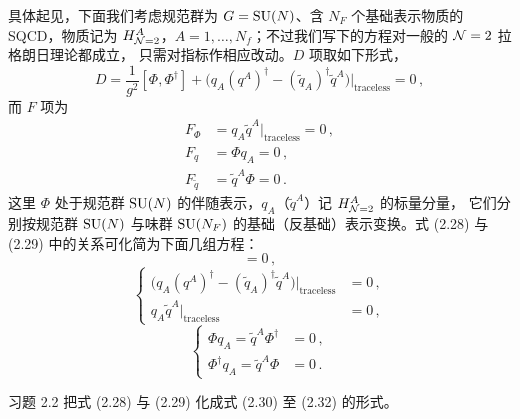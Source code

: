 
具体起见，下面我们考虑规范群为 $G=\mathrm{SU}(N)$、含 $N_F$ 个基础表示物质的 SQCD，物质记为
$H^A_{\mathcal{N}=2}$，$A=1,\dots,N_f$；不过我们写下的方程对一般的 $\mathcal{N}=2$ 拉格朗日理论都成立，
只需对指标作相应改动。$D$ 项取如下形式，
\begin{equation}
  D=\frac{1}{g^2}[\Phi,\Phi^\dagger]+\big(q_A(q^A)^\dagger-(\tilde q_A)^\dagger \tilde q^{A}\big)\big|_{\text{traceless}}=0\,,
  \tag{2.28}
\end{equation}
而 $F$ 项为
\begin{equation}
  \begin{aligned}
    F_\Phi&=q_A\tilde q^{A}\big|_{\text{traceless}}=0\,,\\
    F_q&=\Phi q_A=0\,,\\
    F_{\tilde q}&=\tilde q^{A}\Phi=0\,.
  \end{aligned}
  \tag{2.29}
\end{equation}
这里 $\Phi$ 处于规范群 $\mathrm{SU}(N)$ 的伴随表示，$q_A$（$\tilde q^{A}$）记 $H^A_{\mathcal{N}=2}$ 的标量分量，
它们分别按规范群 $\mathrm{SU}(N)$ 与味群 $\mathrm{SU}(N_F)$ 的基础（反基础）表示变换。式 (2.28) 与 (2.29)
中的关系可化简为下面几组方程：
\begin{equation}
  [\Phi,\Phi^\dagger]=0\,,
  \tag{2.30}
\end{equation}
\begin{equation}
  \left\{\begin{matrix}
    \Big(q_A(q^A)^\dagger-(\tilde q_A)^\dagger \tilde q^{A}\Big)\big|_{\text{traceless}}&=0\,,\\[2pt]
    q_A\tilde q^{A}\big|_{\text{traceless}}&=0\,,
  \end{matrix}\right.
  \tag{2.31}
\end{equation}
\begin{equation}
  \left\{\begin{matrix}
    \Phi q_A=\tilde q^{A}\Phi^\dagger&=0\,,\\[2pt]
    \Phi^\dagger q_A=\tilde q^{A}\Phi&=0\,.
  \end{matrix}\right.
  \tag{2.32}
\end{equation}

\begin{exercisebox}{习题 2.2}
  把式 (2.28) 与 (2.29) 化成式 (2.30) 至 (2.32) 的形式。
\end{exercisebox}

